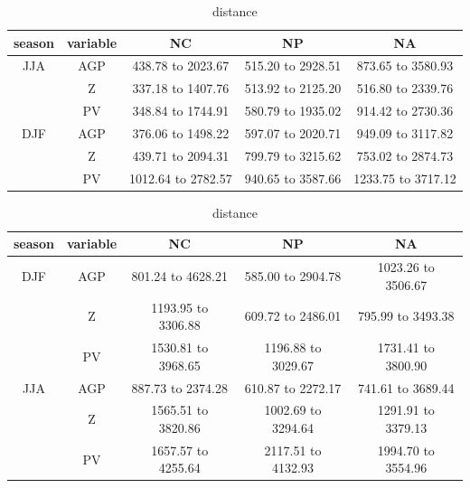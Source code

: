 \documentclass[smallextended]{svjour3}       %
\numberwithin{equation}{section}
\begin{document}
\begin{table}[b]
    \caption{distance}
    \centering
    \begin{tabular}{c|c|c|c|c}
season&variable & NC & NP & NA \\ 
  \hline
JJA & AGP& 438.78 to 2023.67 & 515.20 to 2928.51 & 873.65 to 3580.93 \\
&Z & 337.18 to 1407.76 & 513.92 to 2125.20 & 516.80 to 2339.76 \\
&PV & 348.84 to 1744.91 & 580.79 to 1935.02 & 914.42 to 2730.36 \\
\hline
  DJF & AGP & 376.06 to 1498.22 & 597.07 to 2020.71 & 949.09 to 3117.82 \\ 
    &Z & 439.71 to 2094.31 & 799.79 to 3215.62 & 753.02 to 2874.73 \\ 
    &PV& 1012.64 to 2782.57 & 940.65 to 3587.66 & 1233.75 to 3717.12 \\
    \end{tabular}
        \begin{tabular}{c|c|c|c|c}
season&variable & NC & NP & NA \\ 
  \hline
DJF & AGP & 801.24 to 4628.21 & 585.00 to 2904.78 & 1023.26 to 3506.67 \\ 
&Z & 1193.95 to 3306.88 & 609.72 to 2486.01 & 795.99 to 3493.38 \\ 
&PV& 1530.81 to 3968.65 & 1196.88 to 3029.67 & 1731.41 to 3800.90 \\ 
\hline
  JJA & AGP & 887.73 to 2374.28 & 610.87 to 2272.17 & 741.61 to 3689.44 \\
    &Z & 1565.51 to 3820.86 & 1002.69 to 3294.64 & 1291.91 to 3379.13 \\  
    &PV& 1657.57 to 4255.64 & 2117.51 to 4132.93 & 1994.70 to 3554.96 \\ 
    \end{tabular}
    \label{tab:duration}
\end{table}
\end{document}

